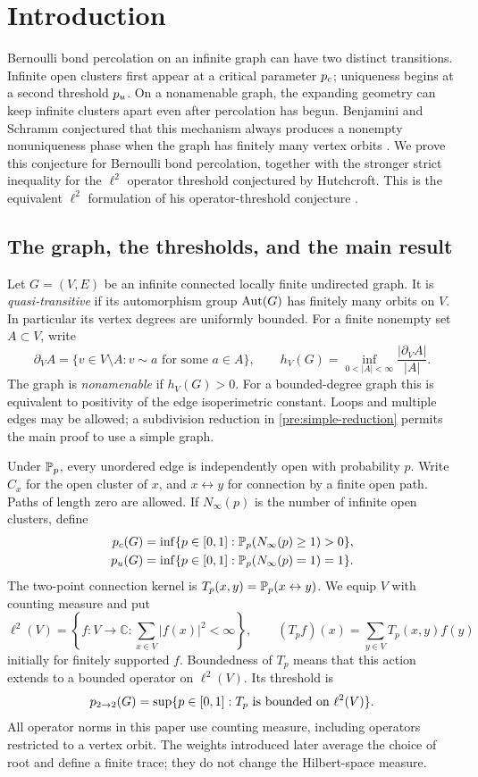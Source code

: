 \section{Introduction}\label{sec:introduction}

Bernoulli bond percolation on an infinite graph can have two distinct
transitions. Infinite open clusters first appear at a critical parameter
${p_c}$; uniqueness begins at a second threshold ${p_u}$. On a nonamenable
graph, the expanding geometry can keep infinite clusters apart even
after percolation has begun. Benjamini and Schramm conjectured that this
mechanism always produces a nonempty nonuniqueness phase when the graph
has finitely many vertex orbits
\cite[Conjecture~6]{BenjaminiSchramm1996}. We prove this conjecture for
Bernoulli bond percolation, together with the stronger strict inequality
for the $\ell^2$ operator threshold conjectured by Hutchcroft.
This is the equivalent $\ell^2$ formulation of his operator-threshold
conjecture \cite[Proposition~2.3 and Conjecture~6.1]{Hutchcroft2019}.

\subsection{The graph, the thresholds, and the main result}

Let $G=(V,E)$ be an infinite connected locally finite undirected graph.
It is \emph{quasi-transitive} if its automorphism group $\operatorname{Aut}(G)$ has
finitely many orbits on $V$. In particular its vertex degrees are
uniformly bounded. For a finite nonempty set $A\subset V$, write
\[
 \partial_V A=\{v\in V\setminus A:v\sim a\text{ for some }a\in A\},
 \qquad
 h_V(G)=\inf_{0<|A|<\infty}\frac{|\partial_V A|}{|A|}.
\]
The graph is \emph{nonamenable} if $h_V(G)>0$. For a bounded-degree
graph this is equivalent to positivity of the edge isoperimetric
constant. Loops and multiple edges may be allowed; a subdivision
reduction in \cref{pre:simple-reduction} permits the main proof to use
a simple graph.

Under $\mathbb P_p$, every unordered edge is independently open with
probability $p$. Write $C_x$ for the open cluster of $x$, and
$x\leftrightarrow y$ for connection by a finite open path. Paths of
length zero are allowed. If $N_\infty(p)$ is the number of infinite
open clusters, define
\begin{align*}
 {p_c}(G)&=\inf\{p\in[0,1]:\mathbb P_p(N_\infty(p)\ge1)>0\},\\
 {p_u}(G)&=\inf\{p\in[0,1]:\mathbb P_p(N_\infty(p)=1)=1\}.
\end{align*}
The two-point connection kernel is $T_p(x,y)=\mathbb P_p(x\leftrightarrow y)$.
We equip $V$ with counting measure and put
\[
 \ell^2(V)=\left\{f:V\to\mathbb C:\sum_{x\in V}|f(x)|^2<\infty\right\},
 \qquad (T_pf)(x)=\sum_{y\in V}T_p(x,y)f(y)
\]
initially for finitely supported $f$. Boundedness of $T_p$ means that
this action extends to a bounded operator on $\ell^2(V)$. Its threshold is
\[
 {p_{2\to2}}(G)=\sup\{p\in[0,1]:T_p\text{ is bounded on }\ell^2(V)\}.
\]
All operator norms in this paper use counting measure, including
operators restricted to a vertex orbit. The weights introduced later
average the choice of root and define a finite trace; they do not
change the Hilbert-space measure.

